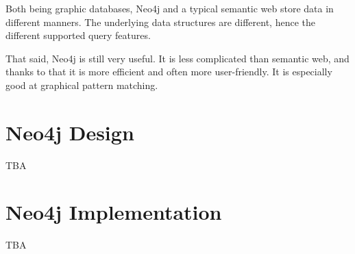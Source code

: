 Both being graphic databases, Neo4j and a typical semantic web store data in different manners. The underlying data structures are different, hence the different supported query features.

That said, Neo4j is still very useful. It is less complicated than semantic web, and thanks to that it is more efficient and often more user-friendly. It is especially good at graphical pattern matching.

\section{Neo4j Design}

TBA

\section{Neo4j Implementation}

TBA
